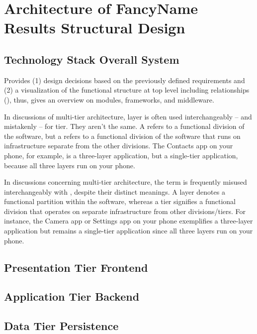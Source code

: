 \documentclass[conference,a4paper,flushend]{cs-techrep} %
\begin{document}
\section{Architecture of FancyName \textbar{} Results \textbar{} Structural Design \textbar{}  }

\subsection{Technology Stack \textbar{} Overall System} %
Provides
(1) design decisions based on the previously defined requirements and
(2) a visualization of the functional structure at top level including relationships (), thus, gives an overview on modules, frameworks, and middleware.

In discussions of multi-tier architecture, layer is often used interchangeably -- and mistakenly -- for tier. They aren't the same. A  refers to a functional division of the software, but a  refers to a functional division of the software that runs on infrastructure separate from the other divisions. The Contacts app on your phone, for example, is a three-layer application, but a single-tier application, because all three layers run on your phone.

In discussions concerning multi-tier architecture, the term  is frequently misused interchangeably with , despite their distinct meanings. A layer denotes a functional partition within the software, whereas a tier signifies a functional division that operates on separate infrastructure from other divisions/tiers. For instance, the Camera app or Settings app on your phone exemplifies a three-layer application but remains a single-tier application since all three layers run on your phone.


\subsection{Presentation Tier \textbar{} Frontend}
\lipsum[13]

\subsection{Application Tier \textbar{} Backend \textbar{} }
\lipsum[14]

\subsection{Data Tier \textbar{} Persistence}
\lipsum[15]
\end{document}
